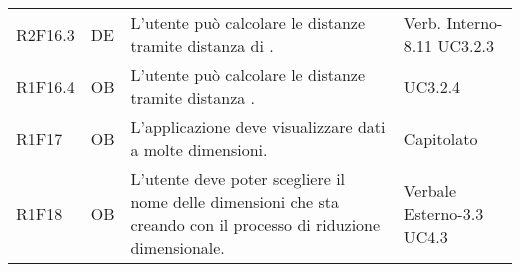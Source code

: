 {\begin{longtable}{C{2cm} | C{1.5cm} | C{9cm} | C{3.3cm}}
R2F16.3 & DE & L'utente può calcolare le distanze tramite distanza di . &  Verb. Interno-8.11 \newline UC3.2.3\\
R1F16.4 & OB & L'utente può calcolare le distanze tramite distanza . &  UC3.2.4\\
R1F17 & OB & L'applicazione deve visualizzare dati a molte dimensioni. & Capitolato\\
R1F18 & OB & L'utente deve poter scegliere il nome delle dimensioni che sta creando con il processo di riduzione dimensionale. & Verbale Esterno-3.3 \newline UC4.3\\

\end{longtable}
}







